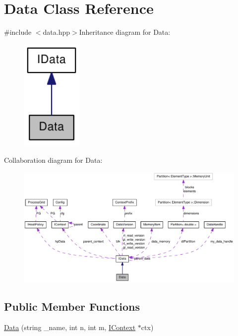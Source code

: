 \hypertarget{class_data}{
\section{Data Class Reference}
\label{class_data}
}


{\ttfamily \#include $<$data.hpp$>$}Inheritance diagram for Data:\nopagebreak
\begin{figure}[H]
\begin{center}
\leavevmode
\includegraphics[width=84pt]{class_data__inherit__graph}
\end{center}
\end{figure}
Collaboration diagram for Data:\nopagebreak
\begin{figure}[H]
\begin{center}
\leavevmode
\includegraphics[width=400pt]{class_data__coll__graph}
\end{center}
\end{figure}
\subsection*{Public Member Functions}
\begin{DoxyCompactItemize}
\item 
\hyperlink{class_data_aabf63a655ba3324cf903784cd80a0124}{Data} (string \_\-name, int n, int m, \hyperlink{class_i_context}{IContext} $\ast$ctx)
\end{DoxyCompactItemize}


